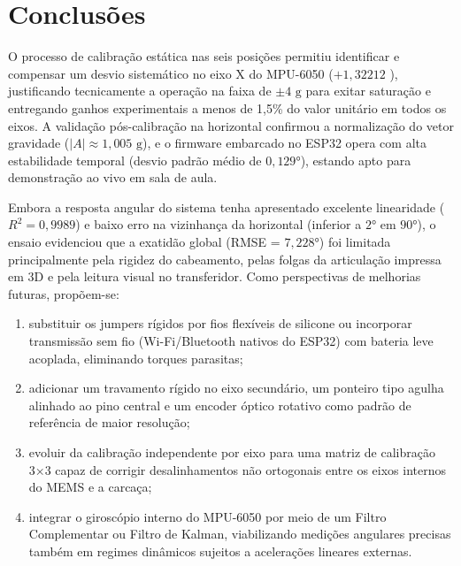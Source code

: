 \section{Conclusões}

O processo de calibração estática nas seis posições permitiu identificar e compensar um desvio sistemático no eixo X do MPU-6050 ($+1,32212$ ), justificando tecnicamente a operação na faixa de $\pm4 \text{ g}$ para exitar saturação e entregando ganhos experimentais a menos de 1,5\% do valor unitário em todos os eixos. A validação pós-calibração na horizontal confirmou a normalização do vetor gravidade ($|A| \approx 1,005 \text{ g}$), e o firmware embarcado no ESP32 opera com alta estabilidade temporal (desvio padrão médio de $0,129°$), estando apto para demonstração ao vivo em sala de aula. 

Embora a resposta angular do sistema tenha apresentado excelente linearidade ($R^2 = 0,9989$) e baixo erro na vizinhança da horizontal (inferior a $2°$ em $90°$), o ensaio evidenciou que a exatidão global (RMSE = $7,228°$) foi limitada principalmente pela rigidez do cabeamento, pelas folgas da articulação impressa em 3D e pela leitura visual no transferidor. Como perspectivas de melhorias futuras, propõem-se:

\begin{enumerate}
    \item substituir os jumpers rígidos por fios flexíveis de silicone ou incorporar transmissão sem fio (Wi-Fi/Bluetooth nativos do ESP32) com bateria leve acoplada, eliminando torques parasitas;

    \item adicionar um travamento rígido no eixo secundário, um ponteiro tipo agulha alinhado ao pino central e um encoder óptico rotativo como padrão de referência de maior resolução;

    \item evoluir da calibração independente por eixo para uma matriz de calibração 3×3 capaz de corrigir desalinhamentos não ortogonais entre os eixos internos do MEMS e a carcaça;

    \item integrar o giroscópio interno do MPU-6050 por meio de um Filtro Complementar ou Filtro de Kalman, viabilizando medições angulares precisas também em regimes dinâmicos sujeitos a acelerações lineares externas.
\end{enumerate}